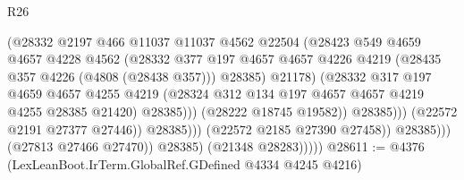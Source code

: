 \begin{lexlean}{R26}
\begin{coremodule}
                                          (@28332
                                            @2197
                                            @466
                                            @11037
                                            @11037
                                            @4562
                                            @22504
                                            (@28423
                                              @549
                                              @4659
                                              @4657
                                              @4228
                                              @4562
                                              (@28332
                                                @377
                                                @197
                                                @4657
                                                @4657
                                                @4226
                                                @4219
                                                (@28435 @357 @4226 (@4808 (@28438 @357)))
                                                @28385)
                                              @21178)
                                            (@28332
                                              @317
                                              @197
                                              @4659
                                              @4657
                                              @4255
                                              @4219
                                              (@28324
                                                @312
                                                @134
                                                @197
                                                @4657
                                                @4657
                                                @4219
                                                @4255
                                                @28385
                                                @21420)
                                              @28385)))
                                        (@28222 @18745 @19582))
                                      @28385)))
                                (@22572 @2191 @27377 @27446))
                              @28385)))
                        (@22572 @2185 @27390 @27458))
                      @28385)))
                (@27813 @27466 @27470))
              @28385)
            (@21348 @28283)))))
@28611 := @4376 (LexLeanBoot.IrTerm.GlobalRef.GDefined @4334 @4245 @4216)

\end{coremodule}
\end{lexlean}
